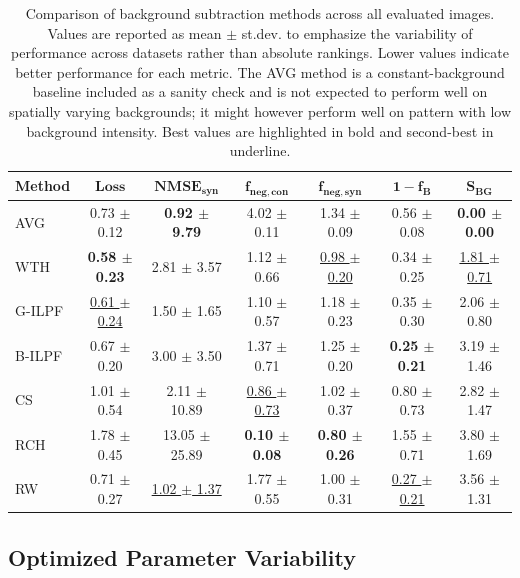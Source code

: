 \documentclass[iucr]{iucrjournals}
\begin{document}
\begin{table}[h]
\caption{Comparison of background subtraction methods across all evaluated images. Values are reported as mean $\pm$ st.dev. to emphasize the variability of performance across datasets rather than absolute rankings. Lower values indicate better performance for each metric. The AVG method is a constant-background baseline included as a sanity check and is not expected to perform well on spatially varying backgrounds; it might however perform well on pattern with low background intensity. Best values are highlighted in bold and second-best in underline.}
\label{tab:method_performance_new}
\centering
\small
\setlength{\tabcolsep}{3pt}
\renewcommand{\arraystretch}{1.1}
\begin{tabular}{@{}lcccccc@{}}
\toprule
\textbf{Method} & $\mathbf{Loss}$ & $\mathbf{NMSE}_{\mathbf{syn}}$ & $\mathbf{f}_{\mathbf{neg,con}}$ & $\mathbf{f}_{\mathbf{neg,syn}}$ & $\mathbf{1-f_B}$ & $\mathbf{S}_{\mathbf{BG}}$ \\
\midrule
AVG & 0.73 $\pm$ 0.12 & \textbf{0.92 $\pm$ 9.79} & 4.02 $\pm$ 0.11 & 1.34 $\pm$ 0.09 & 0.56 $\pm$ 0.08 & \textbf{0.00 $\pm$ 0.00} \\
WTH & \textbf{0.58 $\pm$ 0.23} & 2.81 $\pm$ 3.57 & 1.12 $\pm$ 0.66 & \underline{0.98 $\pm$ 0.20} & 0.34 $\pm$ 0.25 & \underline{1.81 $\pm$ 0.71} \\

G-ILPF & \underline{0.61 $\pm$ 0.24} & 1.50 $\pm$ 1.65 & 1.10 $\pm$ 0.57 & 1.18 $\pm$ 0.23 & 0.35 $\pm$ 0.30 & 2.06 $\pm$ 0.80 \\
B-ILPF & 0.67 $\pm$ 0.20 & 3.00 $\pm$ 3.50 & 1.37 $\pm$ 0.71 & 1.25 $\pm$ 0.20 & \textbf{0.25 $\pm$ 0.21} & 3.19 $\pm$ 1.46 \\
CS & 1.01 $\pm$ 0.54 & 2.11 $\pm$ 10.89 & \underline{0.86 $\pm$ 0.73} & 1.02 $\pm$ 0.37 & 0.80 $\pm$ 0.73 & 2.82 $\pm$ 1.47 \\
RCH & 1.78 $\pm$ 0.45 & 13.05 $\pm$ 25.89 & \textbf{0.10 $\pm$ 0.08} & \textbf{0.80 $\pm$ 0.26} & 1.55 $\pm$ 0.71 & 3.80 $\pm$ 1.69 \\
RW & 0.71 $\pm$ 0.27 & \underline{1.02 $\pm$ 1.37} & 1.77 $\pm$ 0.55 & 1.00 $\pm$ 0.31 & \underline{0.27 $\pm$ 0.21}  & 3.56 $\pm$ 1.31  \\

\bottomrule
\end{tabular}
\end{table}

    


\subsection{Optimized Parameter Variability}
\label{sec:param_variability}
\end{document}
